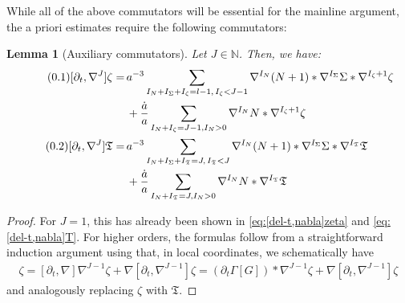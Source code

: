 \documentclass[11pt,leqno,textwidth=10cm]{amsart}
\numberwithin{equation}{section}
\theoremstyle{definition}
\newtheorem{remark}[definition]{Remark}
\theoremstyle{plain}
\newtheorem{lemma}[definition]{Lemma}
\newcommand{\1}{\mathbbm{1}}
\newcommand{\N}{\mathbb{N}}
\newcommand{\del}{\partial}
\newcommand{\Lap}{\Delta}
\renewcommand{\div}{\text{\normalfont{div}}}
\newcommand{\numberthis}{\addtocounter{equation}{1}\tag{\theequation}}
\renewcommand{\theequation}{\arabic{section}.\arabic{equation}}
\newcommand{\todo}[1]{\textcolor{red}{#1}}
\begin{document}

While all of the above commutators will be essential for the mainline argument, the a priori estimates require the following commutators:

\begin{lemma}[Auxiliary commutators]\label{lem:aux-comm} Let $J\in\N$. Then, we have:
\begin{subequations}
\begin{align*}
\numberthis\label{eq:commutator-aux-scalar}[\del_t,\nabla^J]\zeta=&\,a^{-3}\sum_{I_N+I_\Sigma+I_\zeta=l-1,\,I_\zeta<J-1}\nabla^{I_N}(N+1)\ast\nabla^{I_\Sigma}\Sigma\ast\nabla^{I_\zeta+1}\zeta\\
&\,+\frac{\dot{a}}a\sum_{I_N+I_\zeta=J-1,I_N>0}\nabla^{I_N}N\ast\nabla^{I_\zeta+1}\zeta\\
\numberthis\label{eq:commutator-aux-tensor}[\del_t,\nabla^J]\mathfrak{T}=&\,a^{-3}\sum_{I_N+I_\Sigma+I_{\mathfrak{T}}=J,\,I_\mathfrak{T}< J}\nabla^{I_N}(N+1)\ast\nabla^{I_\Sigma}\Sigma\ast\nabla^{I_\mathfrak{T}}\mathfrak{T}\\
&\,+\frac{\dot{a}}a\sum_{I_N+I_\mathfrak{T}=J,I_N>0}\nabla^{I_N}N\ast\nabla^{I_\mathfrak{T}}\mathfrak{T}\\
\end{align*}
\end{subequations}
\end{lemma}
\begin{proof}
For $J=1$, this has already been shown in \eqref{eq:[del-t,nabla]zeta} and \eqref{eq:[del-t,nabla]T}. For higher orders, the formulas follow from a straightforward induction argument using that, in local coordinates, we schematically have
\begin{align*}
[\del_t,\nabla^J]\zeta=[\del_t,\nabla]\nabla^{J-1}\zeta+\nabla[\del_t,\nabla^{J-1}]\zeta=(\del_t\Gamma[G])\ast\nabla^{J-1}\zeta+\nabla[\del_t,\nabla^{J-1}]\zeta
\end{align*}
and analogously replacing $\zeta$ with $\mathfrak{T}$. 
\end{proof}
\end{document}
